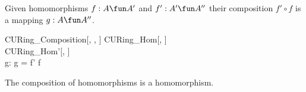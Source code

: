 \documentclass{amsart}
\begin{document}
Given homomorphisms $f : A \fun A'$ and $f': A' \fun A''$ their composition 
$f' \circ f$ is a mapping $g: A \fun A''$.

\begin{schema}{CURing\_Composition}[\genT, \genU, \genV]
	CURing\_Hom[\genT, \genU] \\
	CURing\_Hom'[\genU, \genV] \\
	g: \genT \pfun \genV
\where
	g = f' \circ f
\end{schema}

\begin{remark}
The composition of homomorphisms is a homomorphism.
\end{remark}

\printbibliography
\end{document}
